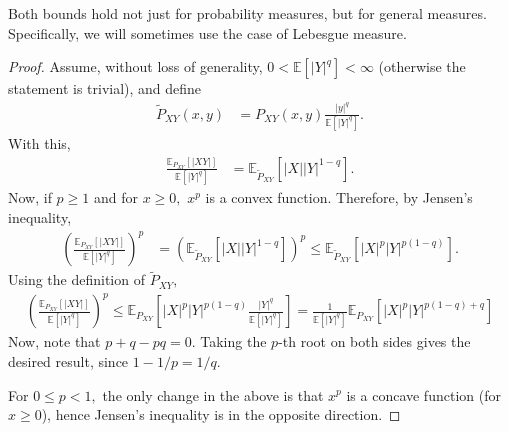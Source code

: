 \documentclass[10pt,a4paper]{amsart}
\begin{document}
\begin{remark}
Both bounds hold not just for probability measures, but for general measures. Specifically, we will sometimes use the case of Lebesgue measure.
\end{remark}

\begin{proof}
Assume, without loss of generality, $0<{\mathbb E}[|Y|^q]<\infty$ (otherwise the statement is trivial), and define
\begin{align}
    \tilde{P}_{XY}(x,y) &= P_{XY}(x,y)\frac{|y|^q}{{\mathbb E}[|Y|^q]}.
\end{align}
With this,
\begin{align}
    \frac{{\mathbb E}_{P_{XY}}[|XY|]}{{\mathbb E}[|Y|^q]} &= {\mathbb E}_{\tilde{P}_{XY}}[|X||Y|^{1-q}].
\end{align}
Now, if $p\ge 1$ and for $x\ge 0,$ $x^p$ is a convex function. Therefore, by Jensen's inequality,
\begin{align}
    \left( \frac{{\mathbb E}_{P_{XY}}[|XY|]}{{\mathbb E}[|Y|^q]} \right)^p &= \left({\mathbb E}_{\tilde{P}_{XY}}[|X||Y|^{1-q}]\right)^p \le {\mathbb E}_{\tilde{P}_{XY}}[|X|^p|Y|^{p(1-q)}].
\end{align}
Using the definition of $\tilde{P}_{XY},$
\begin{align}
    \left( \frac{{\mathbb E}_{P_{XY}}[|XY|]}{{\mathbb E}[|Y|^q]} \right)^p  \le {\mathbb E}_{P_{XY}}\left[|X|^p|Y|^{p(1-q)}\frac{|Y|^q}{{\mathbb E}[|Y|^q]}\right] = \frac{1}{{\mathbb E}[|Y|^q]} {\mathbb E}_{P_{XY}}\left[|X|^p|Y|^{p(1-q)+q}\right]
\end{align}
Now, note that $p+q-pq=0.$ Taking the $p$-th root on both sides gives the desired result, since $1-1/p=1/q.$

For $0\le p <1,$ the only change in the above is that $x^p$ is a concave function (for $x\ge 0$), hence Jensen's inequality is in the opposite direction.
\end{proof}
\end{document}
